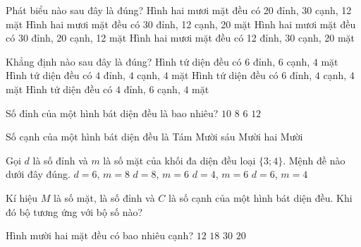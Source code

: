 \begin{ex}%
	Phát biểu nào sau đây là đúng?
	\choice
	{Hình hai mươi mặt đều có 20 đỉnh, 30 cạnh, 12 mặt}
	{Hình hai mươi mặt đều có 30 đỉnh, 12 cạnh, 20 mặt}
	{Hình hai mươi mặt đều có 30 đỉnh, 20 cạnh, 12 mặt}
	{\True Hình hai mươi mặt đều có 12 đỉnh, 30 cạnh, 20 mặt}
\end{ex}
\begin{ex}%
	Khẳng định nào sau đây là đúng?
	\choice
	{Hình tứ diện đều có $6$ đỉnh, $6$ cạnh, $4$ mặt}
	{Hình tứ diện đều có $4$ đỉnh, $4$ cạnh, $4$ mặt}
	{Hình tứ diện đều có $6$ đỉnh, $4$ cạnh, $4$ mặt}
	{\True Hình tứ diện đều có $4$ đỉnh, $6$ cạnh, $4$ mặt}
\end{ex}
\begin{ex}%
	Số đỉnh của một hình bát diện đều là bao nhiêu?
	\choice
	{$10$}
	{$8$}
	{\True $6$}
	{$12$}
\end{ex}
\begin{ex}%
	Số cạnh của một hình bát diện đều là 
	\choice
	{Tám}
	{Mười sáu}
	{\True Mười hai}
	{Mười}
\end{ex}
\begin{ex}%
	Gọi $d$ là số đỉnh và $m$ là số mặt của khối đa diện đều loại $\{3;4\}$. Mệnh đề nào dưới đây đúng. 
	\choice
	{\True $d=6$, $m=8$}
	{$d=8$, $m=6$}
	{$d=4$, $m=6$}
	{$d=6$, $m=4$}
\end{ex}
\begin{ex}%
	Kí hiệu $M$ là số mặt, là số đỉnh và $C$ là số cạnh của một hình bát diện đều. Khi đó bộ tương ứng với bộ số nào?
	\choice
	{}
	{}
	{\True}
	{}
\end{ex}
\begin{ex}%
	Hình mười hai mặt đều có bao nhiêu cạnh?
	\choice
	{$12$}
	{$18$}
	{\True $30$}
	{$20$}
\end{ex}
